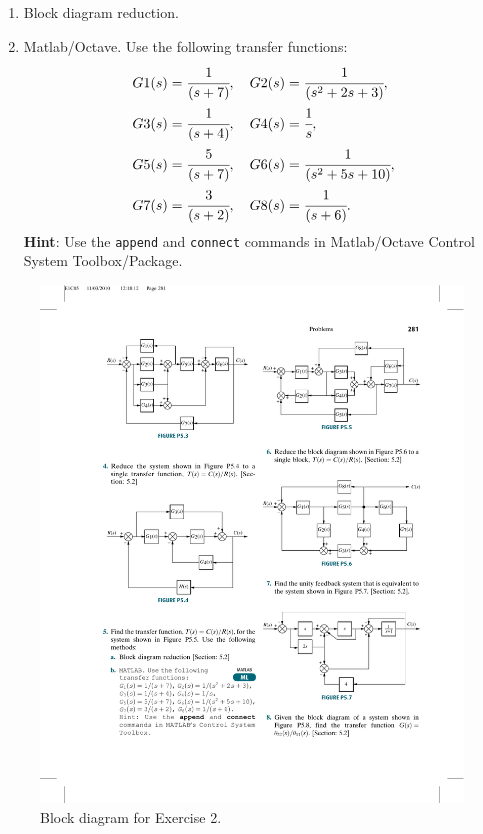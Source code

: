 \documentclass[a4paper,11pt]{article}
\begin{document}
\begin{enumerate}
\item Block diagram reduction.
\item Matlab/Octave. Use the following transfer functions:
\begin{align*}
G1(s)& =\cfrac{1}{(s+7)}, \quad G2(s)=\cfrac{1}{(s^2 + 2 s+3)},\\
G3(s)& =\cfrac{1}{(s+4)}, \quad G4(s) =\cfrac{1}{s},\\
G5(s)& =\cfrac{5}{(s+ 7)}, \quad G6(s) =\cfrac{1}{(s^2 + 5s + 10)},\\
G7(s)&= \cfrac{3}{(s+ 2)}, \quad G8(s) = \cfrac{1}{(s + 6)}. 
\end{align*}
{\bf Hint}: Use the {\tt append} and {\tt connect} commands in Matlab/Octave Control System Toolbox/Package.
\end{enumerate}

\begin{figure}[ht!] \begin{center}
\includegraphics[width=1\textwidth]{Figures/blocks_ex}
 \caption{Block diagram for Exercise 2.} \label{fig:ex2}
\end{center} \end{figure}
\newpage
\vskip0.5cm
\end{document}
